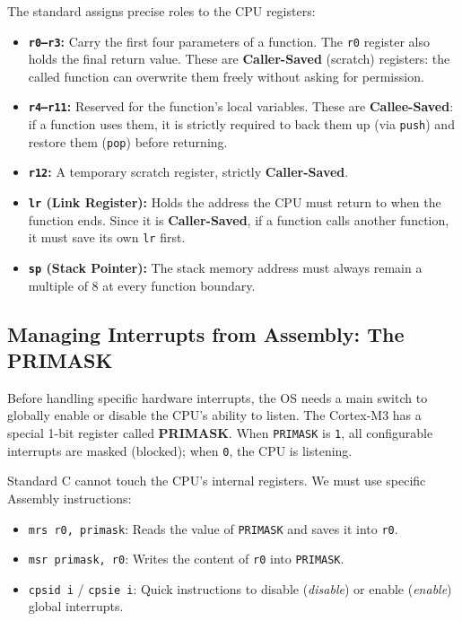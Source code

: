The standard assigns precise roles to the CPU registers:
\begin{itemize}
    \item \textbf{\texttt{r0--r3}:} Carry the first four parameters of a function. The \texttt{r0} register also holds the final return value. These are \textbf{Caller-Saved} (scratch) registers: the called function can overwrite them freely without asking for permission.
    \item \textbf{\texttt{r4--r11}:} Reserved for the function's local variables. These are \textbf{Callee-Saved}: if a function uses them, it is strictly required to back them up (via \texttt{push}) and restore them (\texttt{pop}) before returning.
    \item \textbf{\texttt{r12}:} A temporary scratch register, strictly \textbf{Caller-Saved}.
    \item \textbf{\texttt{lr} (Link Register):} Holds the address the CPU must return to when the function ends. Since it is \textbf{Caller-Saved}, if a function calls another function, it must save its own \texttt{lr} first.
    \item \textbf{\texttt{sp} (Stack Pointer):} The stack memory address must always remain a multiple of 8 at every function boundary.
\end{itemize}

\subsection{Managing Interrupts from Assembly: The PRIMASK}
Before handling specific hardware interrupts, the OS needs a main switch to globally enable or disable the CPU's ability to listen. The Cortex-M3 has a special 1-bit register called \textbf{PRIMASK}. When \texttt{PRIMASK} is \texttt{1}, all configurable interrupts are masked (blocked); when \texttt{0}, the CPU is listening.

Standard C cannot touch the CPU's internal registers. We must use specific Assembly instructions:
\begin{itemize}
    \item \texttt{mrs r0, primask}: Reads the value of \texttt{PRIMASK} and saves it into \texttt{r0}.
    \item \texttt{msr primask, r0}: Writes the content of \texttt{r0} into \texttt{PRIMASK}.
    \item \texttt{cpsid i} / \texttt{cpsie i}: Quick instructions to disable (\textit{disable}) or enable (\textit{enable}) global interrupts.
\end{itemize}

